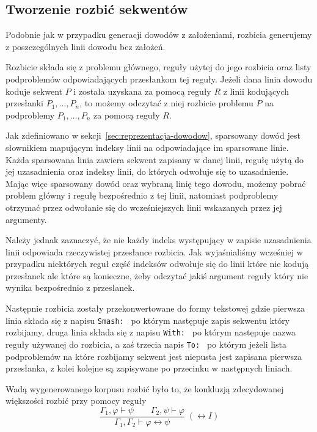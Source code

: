 \documentclass[shortabstract]{iithesis}
\theoremstyle{definition}
\theoremstyle{remark}
\theoremstyle{plain}
\begin{document}
\subsection{Tworzenie rozbić sekwentów}


Podobnie jak w przypadku generacji dowodów z założeniami, rozbicia
generujemy z poszczególnych linii dowodu bez założeń. 

Rozbicie składa się z problemu głównego, reguły użytej do jego rozbicia oraz
listy podproblemów odpowiadających przesłankom tej reguły. Jeżeli dana linia
dowodu koduje sekwent \(P\) i została uzyskana za pomocą reguły \(R\) z linii
kodujących przesłanki \(P_1,\ldots,P_n\), to możemy odczytać z niej rozbicie
problemu \(P\) na podproblemy \(P_1,\ldots,P_n\) za pomocą reguły \(R\).

Jak zdefiniowano w sekcji~\ref{sec:reprezentacja-dowodow}, sparsowany dowód
jest słownikiem mapującym indeksy linii na odpowiadające im sparsowane linie.
Każda sparsowana linia zawiera sekwent zapisany w danej linii, regułę użytą do
jej uzasadnienia oraz indeksy linii, do których odwołuje się to uzasadnienie.
Mając więc sparsowany dowód oraz wybraną linię tego dowodu, możemy pobrać
problem główny i regułę bezpośrednio z tej linii, natomiast podproblemy
otrzymać przez odwołanie się do wcześniejszych linii wskazanych przez jej
argumenty.

Należy jednak zaznaczyć, że nie każdy indeks występujący w zapisie uzasadnienia
linii odpowiada rzeczywistej przesłance rozbicia. Jak wyjaśnialiśmy wcześniej w przypadku niektórych reguł
część indeksów odwołuje się do linii które nie kodują przesłanek ale które są konieczne, żeby 
odczytać jakiś argument reguły który nie wynika bezpośrednio z przesłanek.

Następnie rozbicia zostały przekonwertowane do formy tekstowej gdzie pierwsza linia składa się z napisu \texttt{Smash: } po
którym następuje zapis sekwentu który rozbijamy, druga linia składa się z napisu \texttt{With: } po którym następuje nazwa 
reguły używanej do rozbicia, a zaś trzecia napis \texttt{To: } po którym jeżeli lista podproblemów na które rozbijamy
sekwent jest niepusta jest zapisana pierwsza przesłanka, z kolei kolejne są zapisywane po przecinku w następnych liniach.

Wadą wygenerowanego korpusu rozbić było to, że konkluzją zdecydowanej większości rozbić przy pomocy reguły 
$$\frac{\Gamma_1,\varphi \vdash \psi \qquad \Gamma_2,\psi \vdash \varphi}
     {\Gamma_1,\Gamma_2 \vdash \varphi \leftrightarrow \psi}\;(\leftrightarrow I)$$
\end{document}

